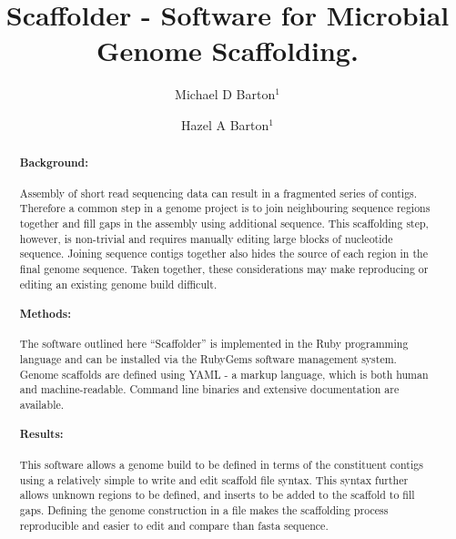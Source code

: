 \documentclass[10pt]{bmc_article}
\newenvironment{bmcformat}{\begin{raggedright}\baselineskip20pt\sloppy\setboolean{publ}{false}}{\end{raggedright}\baselineskip20pt\sloppy}
\begin{document}
\begin{bmcformat}

\title{Scaffolder - Software for Microbial Genome Scaffolding.} %

\author{
  Michael D Barton$^{1}$\correspondingauthor%
\and
  Hazel A Barton$^1$%
      }

\address{\iid(1) Department of Biological Sciences, Northern Kentucky %
University, Nunn Drive, Highland Heights, KY 41076 }%

\maketitle

\clearpage

\begin{abstract} %

  \paragraph*{Background:} Assembly of short read sequencing data can result in
  a fragmented series of contigs. Therefore a common step in a genome project
  is to join neighbouring sequence regions together and fill gaps in the
  assembly using additional sequence. This scaffolding step, however, is
  non-trivial and requires manually editing large blocks of nucleotide
  sequence. Joining sequence contigs together also hides the source of each
  region in the final genome sequence. Taken together, these considerations may
  make reproducing or editing an existing genome build difficult.

  \paragraph*{Methods:} The software outlined here ``Scaffolder'' is
  implemented in the Ruby programming language and can be installed via the
  RubyGems software management system. Genome scaffolds are defined using
  YAML - a markup language, which is both human and machine-readable. Command
  line binaries and extensive documentation are available.

  \paragraph*{Results:} This software allows a genome build to be defined in
  terms of the constituent contigs using a relatively simple to write and edit
  scaffold file syntax. This syntax further allows  unknown regions to be
  defined, and inserts to be added to the scaffold to fill gaps. Defining the
  genome construction in a file makes the scaffolding process reproducible and
  easier to edit and compare than fasta sequence.


\end{abstract}
\end{bmcformat}
\end{document}
